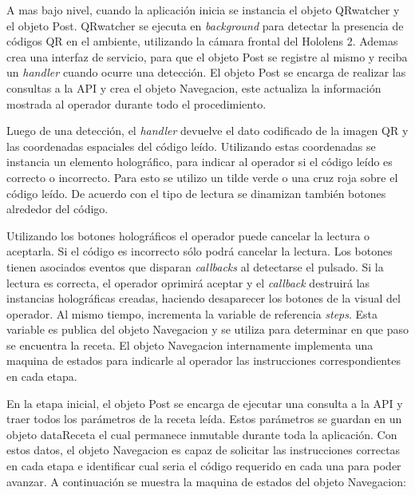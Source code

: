 A mas bajo nivel, cuando la aplicación inicia se instancia el objeto QRwatcher y el objeto Post. QRwatcher se ejecuta en \textit{background} para detectar la presencia de códigos QR en el ambiente, utilizando la cámara frontal del Hololens 2. Ademas crea una interfaz de servicio, para que el objeto Post se registre al mismo y reciba un \textit{handler} cuando ocurre una detección. El objeto Post se encarga de realizar las consultas a la API y crea el objeto Navegacion, este actualiza la información mostrada al operador durante todo el procedimiento. 

Luego de una detección, el \textit{handler} devuelve el dato codificado de la imagen QR y las coordenadas espaciales del código leído. Utilizando estas coordenadas se instancia un elemento holográfico, para indicar al operador si el código leído es correcto o incorrecto. Para esto se utilizo un tilde verde o una cruz roja sobre el código leído. De acuerdo con el tipo de lectura se dinamizan también botones alrededor del código. 

Utilizando los botones holográficos el operador puede cancelar la lectura o aceptarla. Si el código es incorrecto sólo podrá cancelar la lectura. Los botones tienen asociados eventos que disparan \textit{callbacks} al detectarse el pulsado. Si la lectura es correcta, el operador oprimirá aceptar y el \textit{callback} destruirá las instancias holográficas creadas, haciendo desaparecer los botones de la visual del operador. Al mismo tiempo, incrementa la variable de referencia \textit{steps}. Esta variable es publica del objeto Navegacion y se utiliza para determinar en que paso se encuentra la receta. El objeto Navegacion internamente implementa una maquina de estados para indicarle al operador las instrucciones correspondientes en cada etapa. 

En la etapa inicial, el objeto Post se encarga de ejecutar una consulta a la API y traer todos los parámetros de la receta leída. Estos parámetros se guardan en un objeto dataReceta el cual permanece inmutable durante toda la aplicación. Con estos datos, el objeto Navegacion es capaz de solicitar las instrucciones correctas en cada etapa e identificar cual seria el código requerido en cada una para poder avanzar. A continuación se muestra la maquina de estados del objeto Navegacion:

